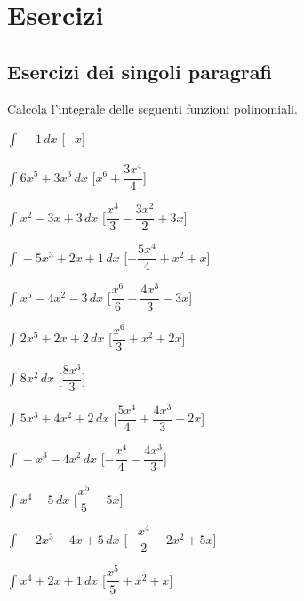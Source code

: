 

\section{Esercizi}

\subsection{Esercizi dei singoli paragrafi}

% 

\begin{esercizio}\label{ese: 1}
Calcola l'integrale delle seguenti funzioni polinomiali.
\begin{multicols}{2}
 \begin{enumeratea}
\item \(\int_{}^{}-1\, dx\) 
 \hfill [\(- x\)]
\item \(\int_{}^{}6 x^{5} + 3 x^{3}\, dx\) 
 \hfill [\(x^{6} + \dfrac{3 x^{4}}{4}\)]
\item \(\int_{}^{}x^{2} - 3 x + 3\, dx\) 
 \hfill [\(\dfrac{x^{3}}{3} - \dfrac{3 x^{2}}{2} + 3 x\)]
\item \(\int_{}^{}- 5 x^{3} + 2 x + 1\, dx\) 
 \hfill [\(- \dfrac{5 x^{4}}{4} + x^{2} + x\)]
\item \(\int_{}^{}x^{5} - 4 x^{2} - 3\, dx\) 
 \hfill [\(\dfrac{x^{6}}{6} - \dfrac{4 x^{3}}{3} - 3 x\)]
\item \(\int_{}^{}2 x^{5} + 2 x + 2\, dx\) 
 \hfill [\(\dfrac{x^{6}}{3} + x^{2} + 2 x\)]
\item \(\int_{}^{}8 x^{2}\, dx\) 
 \hfill [\(\dfrac{8 x^{3}}{3}\)]
\item \(\int_{}^{}5 x^{3} + 4 x^{2} + 2\, dx\) 
 \hfill [\(\dfrac{5 x^{4}}{4} + \dfrac{4 x^{3}}{3} + 2 x\)]
\item \(\int_{}^{}- x^{3} - 4 x^{2}\, dx\) 
 \hfill [\(- \dfrac{x^{4}}{4} - \dfrac{4 x^{3}}{3}\)]
\item \(\int_{}^{}x^{4} - 5\, dx\) 
 \hfill [\(\dfrac{x^{5}}{5} - 5 x\)]
\item \(\int_{}^{}- 2 x^{3} - 4 x + 5\, dx\) 
 \hfill [\(- \dfrac{x^{4}}{2} - 2 x^{2} + 5 x\)]
\item \(\int_{}^{}x^{4} + 2 x + 1\, dx\) 
\hfill [\(\dfrac{x^{5}}{5} + x^{2} + x\)]
 \end{enumeratea}
\end{multicols}
\end{esercizio}

